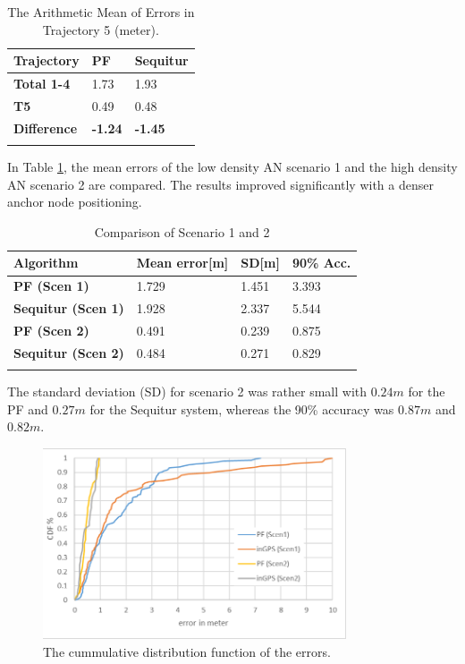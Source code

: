 \begin{table}
\caption{The Arithmetic Mean of Errors in Trajectory 5 (meter).}
\label{tab:arithmetic_errors_trajectory5}
\centering
\begin{tabular}{l l l}
\toprule
\textbf{Trajectory} & \textbf{PF} & \textbf{Sequitur}\\
\midrule
\textbf{Total 1-4} & 1.73 & 1.93\\
\textbf{T5} & 0.49 & 0.48\\
\midrule
\textbf{Difference}  & \textbf{-1.24} & \textbf{-1.45}\\
\bottomrule\\
\end{tabular}
\end{table}
In Table \ref{tab:arithmetic_errors_trajectory5}, the mean errors of the low density AN scenario 1 and the high density AN scenario 2 are compared. The results improved significantly with a denser anchor node positioning. 
\begin{table}
\caption{Comparison of Scenario 1 and 2}
\label{tab:results_trajectory5}
\centering
\begin{tabular}{l l l l}
\toprule
\textbf{Algorithm} & \textbf{Mean error}[m] & \textbf{SD}[m] & \textbf{90\% Acc.}\\
\midrule
\textbf{PF (Scen 1)} & 1.729 & 1.451 & 3.393\\
\textbf{Sequitur (Scen 1)} & 1.928 & 2.337 & 5.544\\
\midrule
\textbf{PF (Scen 2)} & 0.491 & 0.239 & 0.875\\
\textbf{Sequitur (Scen 2)} & 0.484 & 0.271 & 0.829\\
\bottomrule\\
\end{tabular}
\end{table}
The standard deviation (SD) for scenario 2 was rather small with $0.24m$ for the PF and $0.27m$ for the Sequitur system, whereas the 90\% accuracy was $0.87m$ and $0.82m$. 
\begin{figure}[th]
\centering
\includegraphics[width=0.8\textwidth]{Figures/cdf_all}
\decoRule
\caption[CDF Scenario 1 and 2]{The cummulative distribution function of the errors.}
\label{fig:cdf_all}
\end{figure}

